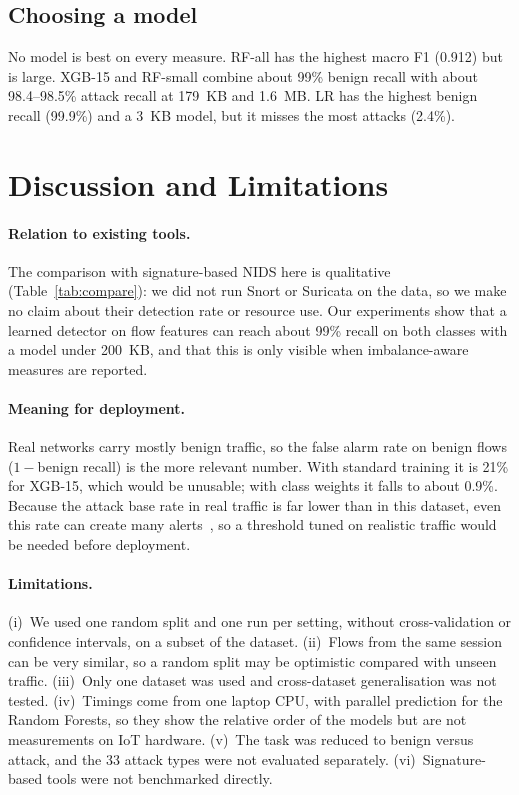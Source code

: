\documentclass[runningheads]{llncs}
\begin{document}
\subsection{Choosing a model}
No model is best on every measure. RF-all has the highest macro F1 (0.912) but is large. XGB-15 and RF-small combine about 99\% benign recall with about 98.4--98.5\% attack recall at 179~KB and 1.6~MB. LR has the highest benign recall (99.9\%) and a 3~KB model, but it misses the most attacks (2.4\%).

\section{Discussion and Limitations}
\label{sec:discussion}

\paragraph{Relation to existing tools.} The comparison with signature-based NIDS here is qualitative (Table~\ref{tab:compare}): we did not run Snort or Suricata on the data, so we make no claim about their detection rate or resource use. Our experiments show that a learned detector on flow features can reach about 99\% recall on both classes with a model under 200~KB, and that this is only visible when imbalance-aware measures are reported.

\paragraph{Meaning for deployment.} Real networks carry mostly benign traffic, so the false alarm rate on benign flows ($1-$benign recall) is the more relevant number. With standard training it is 21\% for XGB-15, which would be unusable; with class weights it falls to about 0.9\%. Because the attack base rate in real traffic is far lower than in this dataset, even this rate can create many alerts~\cite{arp2022}, so a threshold tuned on realistic traffic would be needed before deployment.

\paragraph{Limitations.} (i)~We used one random split and one run per setting, without cross-validation or confidence intervals, on a subset of the dataset. (ii)~Flows from the same session can be very similar, so a random split may be optimistic compared with unseen traffic. (iii)~Only one dataset was used and cross-dataset generalisation was not tested. (iv)~Timings come from one laptop CPU, with parallel prediction for the Random Forests, so they show the relative order of the models but are not measurements on IoT hardware. (v)~The task was reduced to benign versus attack, and the 33 attack types were not evaluated separately. (vi)~Signature-based tools were not benchmarked directly.
\end{document}
